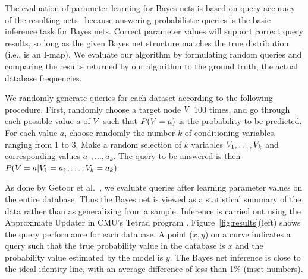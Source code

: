 \documentclass[oribibl]{llncs}
\begin{document}
The evaluation of parameter learning for Bayes nets is based on query accuracy of the resulting nets~\cite{Allen2008} because
answering probabilistic queries is the basic inference task for Bayes nets. Correct parameter values will support correct query results, so long as the given Bayes net structure matches the true distribution (i.e., is an I-map).  We evaluate our algorithm by formulating random queries and comparing the results returned by our algorithm to the ground truth, the actual database frequencies.

We randomly generate queries for each dataset according to the following procedure. First, randomly choose a target node $V$ 100 times, and go through each possible value $a$ of $V$ such that $P(V=a)$ is the probability to be predicted. For each value $a$, choose randomly the number $k$ of conditioning variables, ranging from 1 to 3. Make a random selection of $k$ variables $V_{1},\ldots,V_{k}$ and corresponding values $a_{1},\ldots,a_{k}$. The query to be answered is then $P(V=a|V_{1} = a_{1},\ldots,V_{k}= a_{k}).$


As done by Getoor et al.~\cite{Getoor2001}, we evaluate queries after learning parameter values on the entire database. 
Thus the Bayes net is viewed as a statistical summary of the data rather than as generalizing from a sample. Inference is carried out using the Approximate Updater in CMU's Tetrad program \cite{2008a}.
Figure~\ref{fig:results}(left) shows the query performance for each database.
A point ($x,y$) on a curve indicates a query such that the true probability value in the database is $x$ and the probability value estimated by the model is $y$. 
%
The Bayes net inference is close to the ideal identity line, with an average difference of less than 1\% (inset numbers).
%
\end{document}
